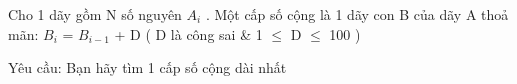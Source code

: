 Cho 1 dãy gồm N số nguyên  $A_{i}$   . Một cấp số cộng là 1 dãy con B của dãy A thoả mãn: $B_{i}$   =  $B_{i-1}$   + D ( D là công sai \& 1  $\le$  D  $\le$  100 )  

   Yêu cầu: Bạn hãy tìm 1 cấp số cộng dài nhất